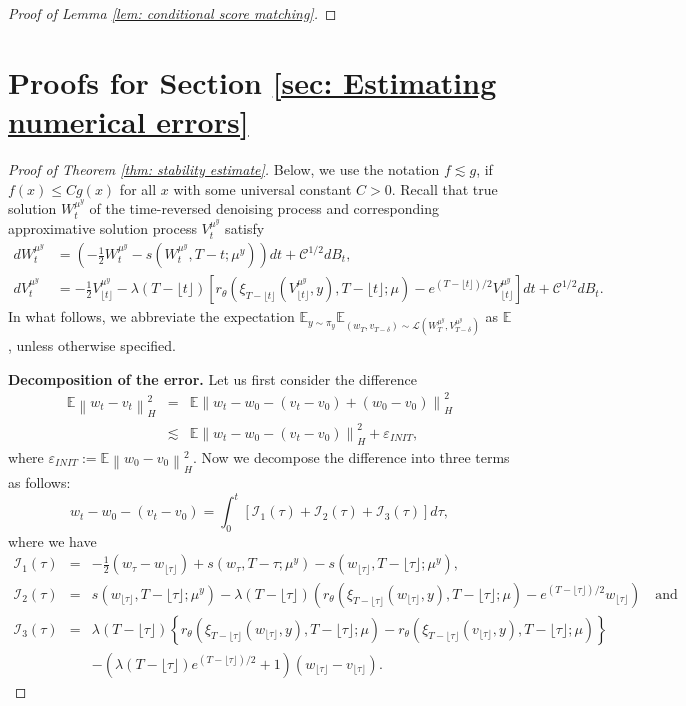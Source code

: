 \documentclass[10pt]{article} %
\newcommand{\E}{\mathbb{E}}
\theoremstyle{plain}
\theoremstyle{definition}
\theoremstyle{remark}
\renewcommand{\L}{\mathscr{L}}
\newcommand{\norm}[1]{\left\|#1\right\|}
\newcommand{\C}{\mathcal C}
\newcommand{\low}[1]{{\lfloor #1 \rfloor}}
\begin{document}
\begin{proof}[Proof of Lemma \ref{lem: conditional score matching}]
\end{proof}
    
\section{Proofs for Section \ref{sec: Estimating numerical errors}}


\begin{proof}[Proof of Theorem \ref{thm: stability estimate}]
Below, we use the notation $f\lesssim g$, if $f(x) \leq C g(x)$ for all $x$ with some universal constant $C>0$. 
Recall that true solution $W_t^{\mu^y}$ of the time-reversed denoising process and corresponding approximative solution process $V_t^{\mu^y}$ satisfy
\begin{align*}
    dW_t^{\mu^y} &= \left(-\frac{1}{2} W_t^{\mu^y} - s(W_t^{\mu^y}, T-t; \mu^y) \right) dt + \C^{1/2} dB_t, \\
    d V_t^{\mu^y} &= -\frac{1}{2}  V_\low{t}^{\mu^y} - \lambda(T-\low{t})\left[ r_\theta\left(\xi_{T - \low t}(V_{\low{t}}^{\mu^y}, y), T-\low{t}; \mu\right)  - e^{(T-\low{t})/2} V_{\low{t}}^{\mu^y} \right] dt +\C^{1/2} dB_t.
\end{align*} 
In what follows, we abbreviate the expectation 
$\E_{y \sim \pi_y}\E_{(w_T, v_{T-\delta}) \sim \L( W_T^{\mu^y},V_{T-\delta}^{\mu^y})}$ as $\E$, unless otherwise specified.

{\bf Decomposition of the error.} Let us first consider the difference
\begin{eqnarray*}
    \E \norm{w_t -  v_t}_H^2 & = & \E \norm{w_t - w_0 - (v_t - v_0) + (w_0 - v_0)}_H^2\\
    &\lesssim&  \E \norm{w_t - w_0 - (v_t - v_0)}_H^2 + \varepsilon_{INIT},
\end{eqnarray*}
where $\varepsilon_{INIT} := \E \norm{w_0 - v_0}_H^2$. 
Now we decompose the difference into three terms as follows:
\begin{equation*}
	w_t - w_0 - (v_t - v_0) = \int_0^t \left[{\mathcal I}_1(\tau) + {\mathcal I}_2(\tau) + {\mathcal I}_3(\tau)\right]d\tau,
\end{equation*}
where we have
\begin{eqnarray*}
	{\mathcal I}_1(\tau) & = & -\frac 12 \left(w_\tau - w_{\low \tau}\right) +
	s(w_\tau, T-\tau; \mu^y)- s(w_{\low\tau}, T-\low \tau; \mu^y), \\
	{\mathcal I}_2(\tau) & = & s(w_{\low \tau}, T - \low \tau; \mu^y) - \lambda(T-\low \tau)\left(r_\theta(\xi_{T-\low\tau}(w_{\low\tau}, y), T-\low \tau; \mu) -e^{(T-\low \tau)/2}w_{\low\tau}\right) \quad \text{and}\\
	{\mathcal I}_3(\tau) & = & \lambda(T-\low \tau) \left\{r_\theta(\xi_{T-\low\tau}(w_{\low\tau}, y), T - \low \tau; \mu) - r_\theta(\xi_{T-\low\tau}(v_{\low\tau}, y), T - \low \tau; \mu)\right\} \\
	& & - (\lambda(T-\low \tau) e^{(T-\low \tau)/2}+1)\left(w_{\low\tau} - v_{\low\tau} \right).
\end{eqnarray*}


\end{proof}
\end{document}
